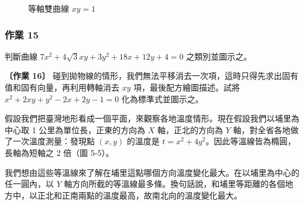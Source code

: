 \begin{figure}[htbp]
\centering
{}
\caption{等軸雙曲線 $xy = 1$}
\label{fig:b4-ch4-fig5-4}
\end{figure}

\subsubsection*{作業 15}
判斷曲線 $7x^2 + 4\sqrt{3}xy + 3y^2 + 18x + 12y + 4 = 0$ 之類別並圖示之。

\textbf{〔作業 16〕} 碰到拋物線的情形，我們無法平移消去一次項，這時只得先求出固有值和固有向量，再利用轉軸消去 $xy$ 項，最後配方繪圖描述。試將 $x^2 + 2xy + y^2 - 2x + 2y - 1 = 0$ 化為標準式並圖示之。

\begin{discussion}

\end{discussion}

假設我們把臺灣地形看成一個平面，來觀察各地溫度情形。現在假設我們以埔里為中心取 1 公里為單位長，正東的方向為 $X$ 軸，正北的方向為 $Y$ 軸，對全省各地做了一次溫度測量：發現點 $(x, y)$ 的溫度是 $t = x^2 + 4y^2$。因此等溫線皆為橢圓，長軸為短軸之 2 倍（圖 5-5）。

我們想由這些等溫線來了解在埔里這點哪個方向溫度變化最大。在以埔里為中心的任一圓內，以 $Y$ 軸方向所截的等溫線最多條。換句話說，和埔里等距離的各個地方中，以正北和正南兩點的溫度最高，故南北向的溫度變化最大。


